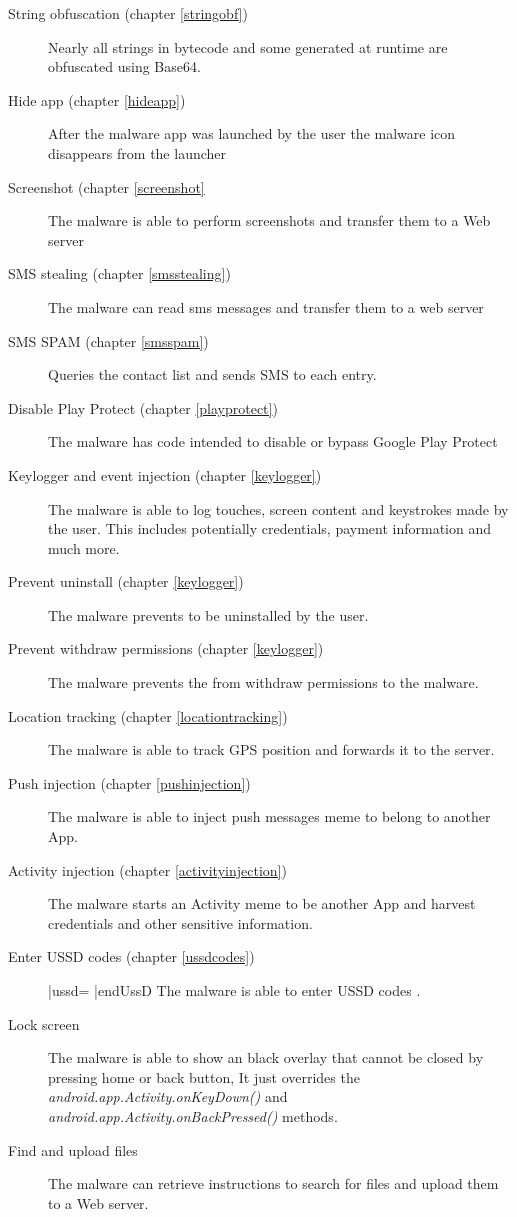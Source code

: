 \documentclass[10pt,titlepage]{article}
\begin{document}
\begin{description}
\item[String obfuscation (chapter \ref{stringobf})] Nearly all strings in bytecode and some generated at runtime are obfuscated using Base64.
\item[Hide app (chapter \ref{hideapp})] After the malware app was launched by the user the malware icon disappears from the launcher
\item[Screenshot (chapter \ref{screenshot}] The malware is able to perform screenshots and transfer them to a Web server
\item[SMS stealing (chapter \ref{smsstealing})] The malware can read sms messages and transfer them to a web server
\item[SMS SPAM (chapter \ref{smsspam})] Queries the contact list and sends SMS to each entry.
\item[Disable Play Protect (chapter \ref{playprotect})] The malware has code intended to disable or bypass Google Play Protect
\item[Keylogger and event injection (chapter \ref{keylogger})] The malware is able to log touches, screen content and keystrokes made by the user. This includes potentially credentials, payment information and much more. 
\item[Prevent uninstall (chapter \ref{keylogger})] The malware prevents to be uninstalled by the user.
\item[Prevent withdraw permissions (chapter \ref{keylogger})] The malware prevents the from withdraw permissions to the malware.
\item[Location tracking (chapter \ref{locationtracking})] The malware is able to track GPS position and forwards it to the server.
\item[Push injection (chapter \ref{pushinjection})]  The malware is able to inject push messages meme to belong to another App.
\item[Activity injection (chapter \ref{activityinjection})] The malware starts an Activity meme to be another App and harvest credentials and other sensitive information.
\item[Enter USSD codes (chapter \ref{ussdcodes})]  |ussd=    |endUssD The malware is able to enter USSD codes \cite{GSMTechnicalSpec}.
\item[Lock screen] The malware is able to show an black overlay that cannot be closed by pressing home or back button, It just overrides the \textit{android.app.Activity.onKeyDown()} and \textit{android.app.Activity.onBackPressed()} methods.
\item[Find and upload files] The malware can retrieve instructions to search for files and upload them to a Web server.
\end{description}
\end{document}
